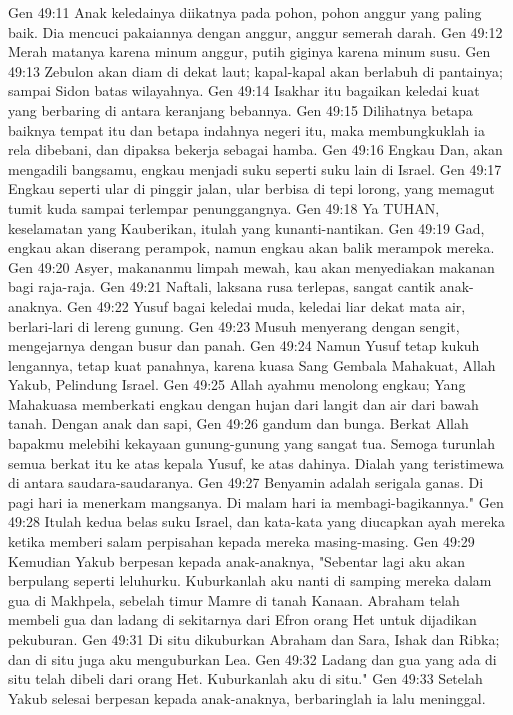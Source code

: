 Gen 49:11  Anak keledainya diikatnya pada pohon, pohon anggur yang paling baik. Dia mencuci pakaiannya dengan anggur, anggur semerah darah.
Gen 49:12  Merah matanya karena minum anggur, putih giginya karena minum susu.
Gen 49:13  Zebulon akan diam di dekat laut; kapal-kapal akan berlabuh di pantainya; sampai Sidon batas wilayahnya.
Gen 49:14  Isakhar itu bagaikan keledai kuat yang berbaring di antara keranjang bebannya.
Gen 49:15  Dilihatnya betapa baiknya tempat itu dan betapa indahnya negeri itu, maka membungkuklah ia rela dibebani, dan dipaksa bekerja sebagai hamba.
Gen 49:16  Engkau Dan, akan mengadili bangsamu, engkau menjadi suku seperti suku lain di Israel.
Gen 49:17  Engkau seperti ular di pinggir jalan, ular berbisa di tepi lorong, yang memagut tumit kuda sampai terlempar penunggangnya.
Gen 49:18  Ya TUHAN, keselamatan yang Kauberikan, itulah yang kunanti-nantikan.
Gen 49:19  Gad, engkau akan diserang perampok, namun engkau akan balik merampok mereka.
Gen 49:20  Asyer, makananmu limpah mewah, kau akan menyediakan makanan bagi raja-raja.
Gen 49:21  Naftali, laksana rusa terlepas, sangat cantik anak-anaknya.
Gen 49:22  Yusuf bagai keledai muda, keledai liar dekat mata air, berlari-lari di lereng gunung.
Gen 49:23  Musuh menyerang dengan sengit, mengejarnya dengan busur dan panah.
Gen 49:24  Namun Yusuf tetap kukuh lengannya, tetap kuat panahnya, karena kuasa Sang Gembala Mahakuat, Allah Yakub, Pelindung Israel.
Gen 49:25  Allah ayahmu menolong engkau; Yang Mahakuasa memberkati engkau dengan hujan dari langit dan air dari bawah tanah. Dengan anak dan sapi,
Gen 49:26  gandum dan bunga. Berkat Allah bapakmu melebihi kekayaan gunung-gunung yang sangat tua. Semoga turunlah semua berkat itu ke atas kepala Yusuf, ke atas dahinya. Dialah yang teristimewa di antara saudara-saudaranya.
Gen 49:27  Benyamin adalah serigala ganas. Di pagi hari ia menerkam mangsanya. Di malam hari ia membagi-bagikannya."
Gen 49:28  Itulah kedua belas suku Israel, dan kata-kata yang diucapkan ayah mereka ketika memberi salam perpisahan kepada mereka masing-masing.
Gen 49:29  Kemudian Yakub berpesan kepada anak-anaknya, "Sebentar lagi aku akan berpulang seperti leluhurku. Kuburkanlah aku nanti di samping mereka dalam gua di Makhpela, sebelah timur Mamre di tanah Kanaan. Abraham telah membeli gua dan ladang di sekitarnya dari Efron orang Het untuk dijadikan pekuburan.
Gen 49:31  Di situ dikuburkan Abraham dan Sara, Ishak dan Ribka; dan di situ juga aku menguburkan Lea.
Gen 49:32  Ladang dan gua yang ada di situ telah dibeli dari orang Het. Kuburkanlah aku di situ."
Gen 49:33  Setelah Yakub selesai berpesan kepada anak-anaknya, berbaringlah ia lalu meninggal.
